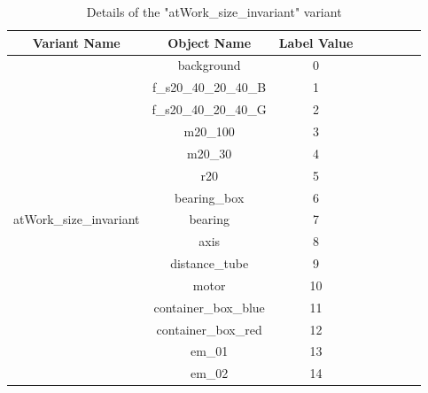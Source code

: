 \begin{itemize}
		\begin{table}[!htb]
			\centering
			\begin{tabular}{|c|c|c|c|c|c|c|c|}
			\hline 
  			\textbf{Variant Name} & \textbf{Object Name} & \textbf{Label Value} \\ 
			\hline
			\multirow{15}{*}{atWork\_size\_invariant} & background & 0 \\ 
			\cline{2-3}%
			 & f\_s20\_40\_20\_40\_B & 1 \\ 
			\cline{2-3} 
			& f\_s20\_40\_20\_40\_G & 2 \\
			\cline{2-3}
			& m20\_100 & 3 \\
			\cline{2-3} 
			& m20\_30 & 4 \\
			\cline{2-3} 
			& r20 & 5 \\
			\cline{2-3} 
			& bearing\_box & 6 \\
			\cline{2-3} 
			& bearing & 7 \\
			\cline{2-3} 
			& axis & 8 \\
			\cline{2-3} 
			& distance\_tube & 9 \\
			\cline{2-3} 
			& motor & 10 \\
			\cline{2-3} 
			& container\_box\_blue & 11 \\
			\cline{2-3} 
			& container\_box\_red & 12 \\
			\cline{2-3} 
			& em\_01 & 13 \\
			\cline{2-3} 
			& em\_02 & 14 \\
			\hline
			\end{tabular}
			\caption{Details of the "atWork\_size\_invariant" variant} 
			\label{Table:size}
		\end{table}
		

\end{itemize}
